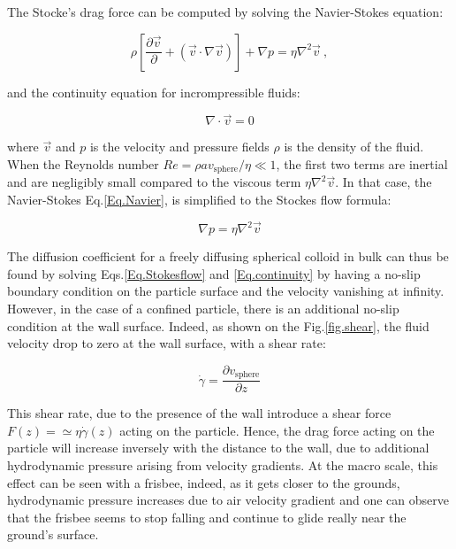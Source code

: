 The Stocke's drag force can be computed by solving the Navier-Stokes equation:

\begin{equation}
	\rho \left[ \frac{\partial \vec{v}}{\partial} + \left(\vec{v} \cdot \nabla \vec{v} \right) \right] + \nabla p = \eta \nabla ^2 \vec{v} ~,
	\label{Eq.Navier}
\end{equation}

and the continuity equation for incrompressible fluids:

\begin{equation}
	\nabla \cdot \vec{v} = 0
	\label{Eq.continuity}
\end{equation}

where $\vec{v}$ and $p$ is the velocity and pressure fields $\rho$ is the density of the fluid. When the Reynolds number $Re = \rho a v_\mathrm{sphere} / \eta \ll 1$,  the first two terms are inertial and are negligibly small compared to the viscous term $\eta \nabla ^2 \vec{v}$. In that case, the Navier-Stokes Eq.\ref{Eq.Navier}, is simplified to the Stockes flow formula:

\begin{equation}
	\nabla p = \eta \nabla ^2 \vec{v}
	\label{Eq.Stokesflow}
\end{equation}

The diffusion coefficient for a freely diffusing spherical colloid in bulk can thus be found by solving Eqs.\ref{Eq.Stokesflow} and \ref{Eq.continuity} by having a no-slip boundary condition on the particle surface and the velocity vanishing at infinity. However, in the case of a confined particle, there is an additional no-slip condition at the wall surface. Indeed, as shown on the Fig.\ref{fig.shear}, the fluid velocity drop to zero at the wall surface, with a shear rate:

\begin{equation}
	\dot{\gamma} = \frac{\partial v_\mathrm{sphere}}{\partial z}
\end{equation} 

This shear rate, due to the presence of the wall introduce a shear force $F(z) = \simeq \eta \dot{\gamma} (z) $ acting on the particle. Hence, the drag force acting on the particle will increase inversely with the distance to the wall, due to additional hydrodynamic pressure arising from velocity gradients. At the macro scale, this effect can be seen with a frisbee, indeed, as it gets closer to the grounds, hydrodynamic pressure increases due to air velocity gradient and one can observe that the frisbee seems to stop falling and continue to glide really near the ground's surface.

